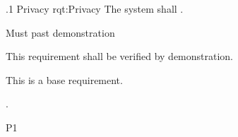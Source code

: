 \ONERQMTV
{\RqtNumberBase.1}
{Privacy}
{rqt:Privacy}
{The system shall \TBD.}
{
	\item [Phase 1] Must past demonstration
}
{This requirement shall be verified by demonstration.}
{
\item [N/A] This is a base requirement.
}
{
	\item \TBD.
}
{P1}
